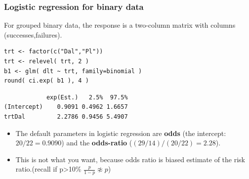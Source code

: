 \documentclass[handout,12pt,dvipsnames,t]{beamer}
\begin{document}
\begin{frame}[fragile]
  \frametitle{Logistic regression for binary data}
  For grouped binary data, the response is a two-column matrix with
  columns (successes,failures).



\begin{lstlisting}
trt <- factor(c("Dal","Pl"))
trt <- relevel( trt, 2 )
b1 <- glm( dlt ~ trt, family=binomial )
round( ci.exp( b1 ), 4 )
\end{lstlisting}
\begin{lstlisting}
            exp(Est.)   2.5%  97.5%
(Intercept)    0.9091 0.4962 1.6657
trtDal         2.2786 0.9456 5.4907
\end{lstlisting}
\begin{itemize}
\item The default parameters in logistic regression are \textbf{odds} (the
intercept: $20/22=0.9090$) and the \textbf{odds-ratio}
($(29/14)/(20/22)=2.28$).

\item This is not what you want, because odds ratio is biased estimate of the
 risk ratio.(recall if p>10\% $\frac{p}{1-p} \not \approx p$)
\end{itemize}

\end{frame}
\end{document}

